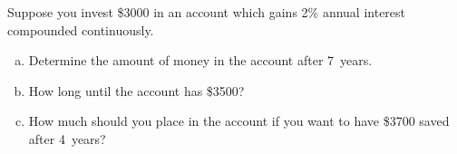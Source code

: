 \documentclass[11pt,letterpaper]{article}
\begin{document}
\newpage





 Suppose you invest \$3000 in an account which gains 2\% annual interest compounded continuously. 
        \begin{enumerate}[(a)]
        \item Determine the amount of money in the account after 7~years.
        \item How long until the account has \$3500?
        \item How much should you place in the account if you want to have \$3700 saved after 4~years?
        \end{enumerate} \pspace


\end{document}

